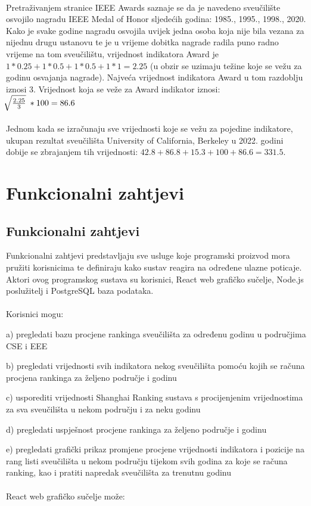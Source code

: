 \documentclass[times, utf8, zavrsni]{fer}
\begin{document}
\\ Pretraživanjem stranice IEEE Awards saznaje se da je navedeno sveučilište osvojilo nagradu IEEE Medal of Honor sljedećih godina: 1985., 1995., 1998., 2020. Kako je 
svake godine nagradu osvojila uvijek jedna osoba koja nije bila vezana za nijednu drugu ustanovu te je u vrijeme dobitka nagrade
radila puno radno vrijeme na tom sveučilištu, vrijednost 
indikatora Award je $1*0.25+1*0.5+1*0.5+1*1 = 2.25$ (u obzir se uzimaju težine koje se vežu za godinu osvajanja nagrade). Najveća vrijednost 
indikatora Award u tom razdoblju iznosi 3. Vrijednost koja se veže za Award indikator iznosi: \; \\ $\sqrt[\leftroot{-2}]{\frac{2.25}{3}} \; * 100 = 86.6$
\\\\Jednom kada se izračunaju sve vrijednosti koje se vežu za pojedine indikatore,
ukupan rezultat sveučilišta University of California, Berkeley u 2022. godini dobije se zbrajanjem tih vrijednosti: $42.8+86.8+15.3+100+86.6 = 331.5$.

\chapter{Funkcionalni zahtjevi}
\section{Funkcionalni zahtjevi}
Funkcionalni zahtjevi predstavljaju sve usluge koje programski proizvod mora pružiti korisnicima te definiraju kako sustav reagira na određene ulazne poticaje.
\\ Aktori ovog programskog sustava su korisnici, React web grafičko sučelje, Node.js poslužitelj i PostgreSQL baza podataka.
\\
\\Korisnici mogu:

a) pregledati bazu procjene rankinga sveučilišta za određenu godinu u područjima CSE i EEE

b) pregledati vrijednosti svih indikatora nekog sveučilišta pomoću kojih se računa procjena rankinga za željeno područje i godinu

c) usporediti vrijednosti Shanghai Ranking sustava s procijenjenim vrijednostima za sva sveučilišta u nekom području i za neku godinu

d) pregledati uspješnost procjene rankinga za željeno područje i godinu

e) pregledati grafički prikaz promjene procjene vrijednosti indikatora i pozicije na rang listi sveučilišta u nekom području tijekom svih godina 
za koje se računa ranking, kao i pratiti napredak sveučilišta za trenutnu godinu
\\
\\React web grafičko sučelje može:
\end{document}

